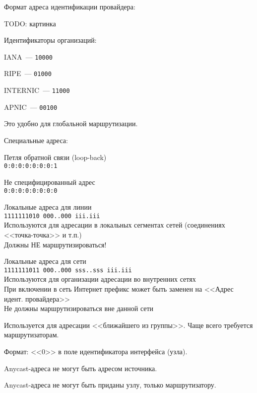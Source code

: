 Формат адреса идентификации провайдера:

TODO: картинка

Идентификаторы организаций:
\begin{MyItemize}
    \item IANA~--- {\tt 10000}
    \item RIPE~--- {\tt 01000}
    \item INTERNIC~--- {\tt 11000}
    \item APNIC~--- {\tt 00100}
\end{MyItemize}

Это удобно для глобальной маршрутизации.

Специальные адреса:
\begin{MyItemize}
    \item Петля обратной связи (loop-back)\\
    {\tt 0:0:0:0:0:0:0:1}
    \item Не специфицированный адрес\\
    {\tt 0:0:0:0:0:0:0:0}
    \item Локальные адреса для линии\\
    {\tt 1111111010 000..000 iii.iii}\\
    Используются для адресации в локальных сегментах сетей (соединениях <<точка-точка>> и т.п.)\\
    Должны НЕ маршрутизироваться!
    \item Локальные адреса для сети\\
    {\tt 1111111011 000..000 sss..sss iii.iii}\\
    Используются для организации адресации во внутренних сетях\\
    При включении в сеть Интернет префикс может быть заменен на <<Адрес идент. провайдера>>\\
    Не должны маршрутизироваться вне данной сети
\end{MyItemize}


Используется для адресации <<ближайшего из группы>>. Чаще всего требуется маршрутизаторам.

Формат: <<0>> в поле идентификатора интерфейса (узла).

Anycast-адреса не могут быть адресом источника.

Anycast-адреса не могут быть приданы узлу, только маршрутизатору.


